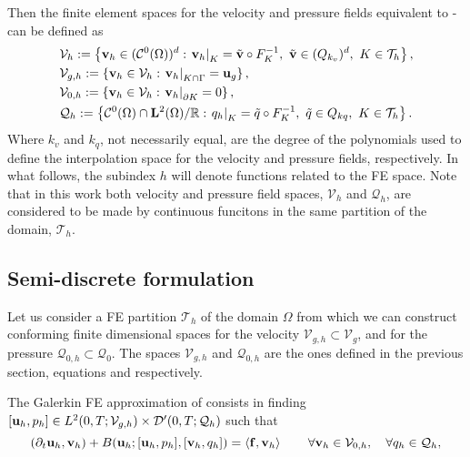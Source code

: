 Then the finite element spaces for the velocity and pressure fields equivalent to - can be defined as
\begin{align}
\label{eq-C2_varia_NS_vh_space}
&\mathcal{V}_{h}:=\left\{{\bf v}_h\in(\mathcal{C}^0(\Omega))^d:\left.{\bf v}_h\right|_K=\tilde{{\bf v}}\circ F_K^{-1},\ \tilde{{\bf v}}\in(Q_{k_v})^d,\ K\in\mathcal{T}_h\right\},\\
\label{eq-C2_varia_NS_vgh_space}
&\mathcal{V}_{g,h}:=\left\{{\bf v}_h\in\mathcal{V}_h:\left.{\bf v}_h\right|_{K\cap\Gamma}={\bf u}_g\right\},\\
\label{eq-C2_varia_NS_v0h_space}
&\mathcal{V}_{0,h}:=\left\{{\bf v}_h\in\mathcal{V}_h:\left.{\bf v}_h\right|_{\partial K}=0\right\},\\
\label{eq-C2_varia_NS_qh_space}
&\mathcal{Q}_h:=\left\{\mathcal{C}^0(\Omega)\cap{\bf L}^2(\Omega)/\mathbb{R}:\left.q_h\right|_K=\tilde{q}\circ F_K^{-1},\ \tilde{q}\in Q_{kq},\ K\in\mathcal{T}_h \right\}.
\end{align}
Where $ k_v $ and $ k_q $, not necessarily equal, are the degree of the polynomials used to define the interpolation space for the velocity and pressure fields, respectively. In what follows, the subindex $ h $ will denote functions related to the FE space. Note that in this work both velocity and pressure field spaces, $ \mathcal{V}_h $ and $ \mathcal{Q}_h $, are considered to be made by continuous funcitons in the same partition of the domain, $ \mathcal{T}_h $.

\subsection{Semi-discrete formulation}
\label{subsec-variational_semidiscrete}
Let us consider a FE partition $ \mathcal{T}_h $ of the domain $ \Omega $ from which we can construct conforming finite dimensional spaces for the velocity $\mathcal{V}_{g,h}\subset\mathcal{V}_g$, and for the pressure $ \mathcal{Q}_{0,h}\subset\mathcal{Q}_0 $. The spaces $\mathcal{V}_{g,h}$ and $ \mathcal{Q}_{0,h} $ are the ones defined in the previous section, equations  and  respectively.

The Galerkin FE approximation of  consists in finding $[{\bf u}_h,p_h]\in {L}^2(0,T;\mathcal{V}_{g,h})\times {\cal D}'(0,T;\mathcal{Q}_h)$ such that
\begin{equation}
\label{eq-C2_NS_weak_discrete}
(\partial_t{\bf u}_h,{\bf v}_h) + B({\bf u}_h;[{\bf u}_h,p_h],[{\bf v}_h,q_h]) = \left<{\bf f},{\bf v}_h\right> 
\quad\quad\forall{\bf v}_h\in\mathcal{V}_{0,h},\quad\forall q_h\in\mathcal{Q}_h,
\end{equation}

